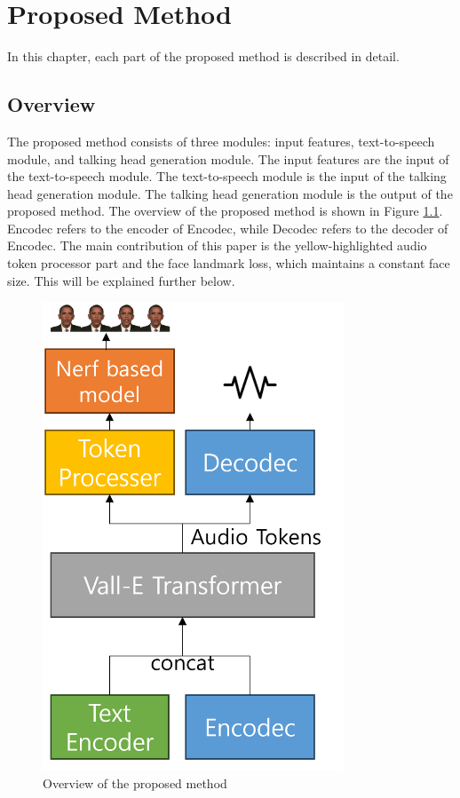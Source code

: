 \chapter{Proposed Method}
\label{chap:Method}
In this chapter, each part of the proposed method is described in detail.

\section{Overview}
The proposed method consists of three modules: input features, text-to-speech module, and talking head generation module.
The input features are the input of the text-to-speech module. The text-to-speech module is the input of the talking head generation module.
The talking head generation module is the output of the proposed method.
The overview of the proposed method is shown in Figure \ref{fig:overview}. Encodec refers to the encoder of Encodec, while Decodec refers to the decoder of Encodec.
The main contribution of this paper is the yellow-highlighted audio token processor part and the face landmark loss, which maintains a constant face size. This will be explained further below.
\begin{figure}
    \centering
    \includegraphics[width=0.8\textwidth]{figures/figure_chap_3/overview.png}
    \caption{Overview of the proposed method}
    \label{fig:overview}
\end{figure}
